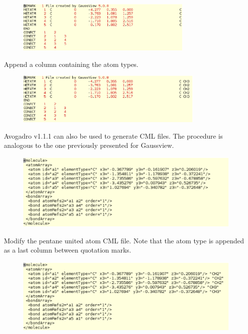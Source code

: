 \begin{figure}[h]
\begin{center}
\includegraphics[height=1in]{pdbfile_final.eps}
\end{center}
\end{figure}

Append a column containing the atom types.

\begin{figure}[h]
\begin{center}
\includegraphics[height=1in]{pdbfile_edited_final.eps}
\end{center}
\end{figure}

Avogadro v1.1.1 can also be used to generate CML files. The procedure is analogous 
to the one previously presented for Gaussview.

\begin{figure}[h]
\begin{center}
\includegraphics[height=1.5in]{pentane_cml.eps}
\end{center}
\end{figure}

\vspace{3in}
Modify the pentane united atom CML file. Note that the atom type is appended as a last
column between quotation marks.

\begin{figure}[h]
\begin{center}
\includegraphics[height=1.5in]{pentane_cml_modified.eps}
\end{center}
\end{figure}

